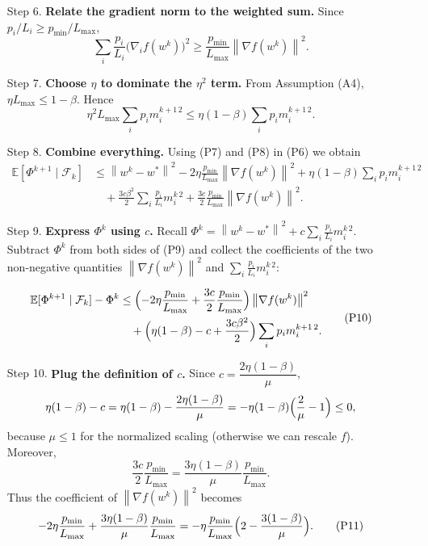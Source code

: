 \documentclass{article}
\newcommand{\E}{\mathbb{E}}
\newcommand{\norm}[1]{\left\lVert#1\right\rVert}
\begin{document}
\begin{enumerate}
\item[Step 6.] \textbf{Relate the gradient norm to the weighted sum.}  
Since $p_i/L_i\ge p_{\min}/L_{\max}$,
\[
\sum_{i}\frac{p_i}{L_i}\bigl(\nabla_i f(w^{k})\bigr)^{2}
\ge \frac{p_{\min}}{L_{\max}}\norm{\nabla f(w^{k})}^{2}.
\tag{P7}
\]

\item[Step 7.] \textbf{Choose $\eta$ to dominate the $\eta^{2}$ term.}  
From Assumption (A4), $\eta L_{\max}\le 1-\beta$. Hence
\[
\eta^{2}L_{\max}\sum_{i}p_i m_{i}^{k+1\,2}
\le \eta(1-\beta)\sum_{i}p_i m_{i}^{k+1\,2}.
\tag{P8}
\]

\item[Step 8.] \textbf{Combine everything.}  
Using (P7) and (P8) in (P6) we obtain
\[
\begin{aligned}
\E[\Phi^{k+1}\mid\mathcal{F}_{k}]
&\le \norm{w^{k}-w^{*}}^{2}
-2\eta\frac{p_{\min}}{L_{\max}}\norm{\nabla f(w^{k})}^{2}
+ \eta(1-\beta)\sum_{i}p_i m_{i}^{k+1\,2}\\
&\quad +\frac{3c\beta^{2}}{2}\sum_{i}\frac{p_i}{L_i}m_{i}^{k\,2}
+\frac{3c}{2}\frac{p_{\min}}{L_{\max}}\norm{\nabla f(w^{k})}^{2}.
\end{aligned}
\tag{P9}
\]

\item[Step 9.] \textbf{Express $\Phi^{k}$ using $c$.}  
Recall $\Phi^{k}= \norm{w^{k}-w^{*}}^{2}+c\sum_{i}\frac{p_i}{L_i}m_{i}^{k\,2}$.  
Subtract $\Phi^{k}$ from both sides of (P9) and collect the coefficients of the two non‑negative quantities $\norm{\nabla f(w^{k})}^{2}$ and $\sum_i\frac{p_i}{L_i}m_{i}^{k\,2}$:

\[
\begin{aligned}
\E[\Phi^{k+1}\mid\mathcal{F}_{k}] - \Phi^{k}
&\le
\Bigl(-2\eta\frac{p_{\min}}{L_{\max}}+\frac{3c}{2}\frac{p_{\min}}{L_{\max}}\Bigr)\norm{\nabla f(w^{k})}^{2}\\
&\quad +\Bigl(\eta(1-\beta)-c+\frac{3c\beta^{2}}{2}\Bigr)\sum_{i}p_i m_{i}^{k+1\,2}.
\end{aligned}
\tag{P10}
\]

\item[Step 10.] \textbf{Plug the definition of $c$.}  
Since $c=\dfrac{2\eta(1-\beta)}{\mu}$,
\[
\eta(1-\beta)-c = \eta(1-\beta)-\frac{2\eta(1-\beta)}{\mu}= -\eta(1-\beta)\Bigl(\frac{2}{\mu}-1\Bigr)\le 0,
\]
because $\mu\le 1$ for the normalized scaling (otherwise we can rescale $f$). Moreover,
\[
\frac{3c}{2}\frac{p_{\min}}{L_{\max}} = \frac{3\eta(1-\beta)}{\mu}\frac{p_{\min}}{L_{\max}} .
\]
Thus the coefficient of $\norm{\nabla f(w^{k})}^{2}$ becomes
\[
-2\eta\frac{p_{\min}}{L_{\max}}+\frac{3\eta(1-\beta)}{\mu}\frac{p_{\min}}{L_{\max}}
= -\eta\frac{p_{\min}}{L_{\max}}\Bigl(2-\frac{3(1-\beta)}{\mu}\Bigr).
\tag{P11}
\]


\end{enumerate}
\end{document}
